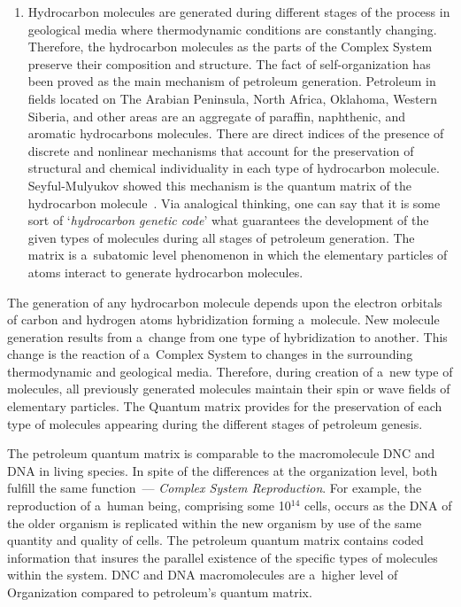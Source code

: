\begin{multicols}{2}
\begin{enumerate}[1.]
\item Hydrocarbon molecules are generated during different stages of the process in geological 
media where thermodynamic conditions are constantly changing. Therefore, the hydrocarbon 
molecules as the parts of the Complex System preserve their composition and structure. 
The fact of self-organization has 
been proved as the main mechanism of petroleum generation. 
Petroleum in fields located on The Arabian Peninsula, North Africa, Oklahoma, Western 
Siberia, and other areas are an aggregate of paraffin, naphthenic, and aromatic hydrocarbons 
molecules. There are direct indices of the presence of discrete and nonlinear mechanisms that 
account for the preservation of structural and chemical individuality in each type of 
hydrocarbon molecule. Seyful-Mulyukov showed this mechanism is the quantum matrix of the 
hydrocarbon molecule~\cite{19-sel}. Via analogical thinking, one can say that it is some sort of 
`\textit{hydrocarbon genetic code}' what guarantees the development of the given types of 
molecules during all stages of petroleum generation. The matrix is a~subatomic level 
phenomenon in which the elementary particles of atoms interact to generate hydrocarbon 
molecules.
\end{enumerate}

The generation of any hydrocarbon molecule depends upon the electron orbitals of carbon and 
hydrogen atoms hybridization forming a~molecule. New molecule generation results from 
a~change from one type of hybridization to another. This change is the reaction of a~Complex 
System to changes in the surrounding thermodynamic and geological media. Therefore, during 
creation of a~new type of molecules, all previously generated molecules maintain their spin or 
wave fields of elementary particles. The Quantum matrix provides for the preservation of each 
type of molecules appearing during the different stages of petroleum genesis. 

The petroleum quantum matrix is comparable to the macromolecule DNC and DNA in living 
species. In spite of the differences at the organization level, both fulfill the same function~--- 
\textit{Complex System Reproduction}. For example, the reproduction of a~human being, 
comprising some 10$^{14}$ cells, occurs as the DNA of the older organism is replicated within 
the new organism by use of the same quantity and quality of cells. The petroleum quantum 
matrix contains coded information that insures the parallel existence of the specific types of 
molecules within the system. DNC and DNA macromolecules are a~higher level of Organization 
compared to petroleum's quantum matrix.  


\end{multicols}
